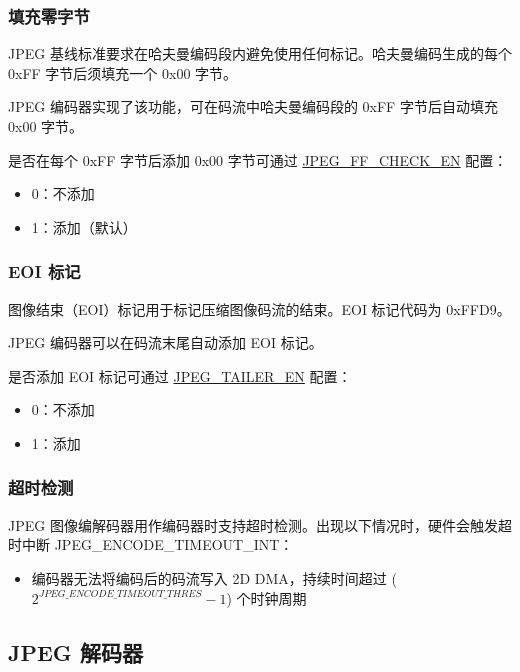 \documentclass[main\_\_CN.tex]{subfiles}
\begin{document}
\subsubsection{填充零字节}
\label{sec:jpegcodec-enc-zero_byte}

JPEG 基线标准要求在哈夫曼编码段内避免使用任何标记。哈夫曼编码生成的每个 0xFF 字节后须填充一个 0x00 字节。

JPEG 编码器实现了该功能，可在码流中哈夫曼编码段的 0xFF 字节后自动填充 0x00 字节。

是否在每个 0xFF 字节后添加 0x00 字节可通过 \hyperref[fielddesc:JPEGFFCHECKEN]{JPEG\_FF\_CHECK\_EN} 配置：
\begin{itemize}
    \item 0：不添加
    \item 1：添加（默认）
\end{itemize}

\subsubsection{EOI 标记}
\label{sec:jpegcodec-enc-eoi}

图像结束（EOI）标记用于标记压缩图像码流的结束。EOI 标记代码为 0xFFD9。

JPEG 编码器可以在码流末尾自动添加 EOI 标记。

是否添加 EOI 标记可通过 \hyperref[fielddesc:JPEGTAILEREN]{JPEG\_TAILER\_EN} 配置：
\begin{itemize}
    \item 0：不添加
    \item 1：添加
\end{itemize}

\subsubsection{超时检测}
\label{sec:jpegcodec-enc-timeout}

JPEG 图像编解码器用作编码器时支持超时检测。出现以下情况时，硬件会触发超时中断 JPEG\_ENCODE\_TIMEOUT\_INT：
\begin{itemize}
    \item 编码器无法将编码后的码流写入 2D DMA，持续时间超过 ($ 2 ^ {\hyperref[fielddesc:JPEGENCODETIMEOUTTHRES]{JPEG\_ENCODE\_TIMEOUT\_THRES}} - 1 $) 个时钟周期
\end{itemize}

\subsection{JPEG 解码器}
\label{sec:jpegcodec-dec-mode}
\end{document}
